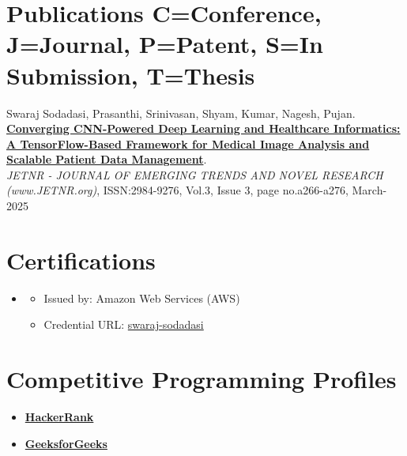 \documentclass[a4paper,11pt]{article}
\begin{document}
\section{\textbf{Publications} {\scriptsize C=Conference, J=Journal, P=Patent, S=In Submission, T=Thesis}}
\vspace{0.2mm}
\small{
\begin{enumerate}[leftmargin=*, labelsep=0.5em, align=left, widest={[\textbf{S.1}]}, itemindent=0em, label={\textbf{[\arabic*]}]}]
\item[\textbf{[J.1]}] Swaraj Sodadasi, Prasanthi, Srinivasan, Shyam, Kumar, Nagesh, Pujan. \\
\href{https://rjpn.org/jetnr/viewpaperforall.php?paper=JETNR2503029}{\textbf{Converging CNN-Powered Deep Learning and Healthcare Informatics: A TensorFlow-Based Framework for Medical Image Analysis and Scalable Patient Data Management}}. \\
\textit{JETNR - JOURNAL OF EMERGING TRENDS AND NOVEL RESEARCH (www.JETNR.org)}, ISSN:2984-9276, Vol.3, Issue 3, page no.a266-a276, March-2025
\end{enumerate}
}


\section*{\textbf{Certifications}}

\begin{itemize}[leftmargin=*]

    \item \textbf{}
    \begin{itemize}
        \item Issued by: Amazon Web Services (AWS)
        \item Credential URL: \href{https://www.credly.com/users/sodadasi-swaraj}{swaraj-sodadasi}
    \end{itemize}

\end{itemize}


\section*{\textbf{Competitive Programming Profiles}}
\begin{itemize}
    \item \href{https://www.hackerrank.com/profile/swarajacc12004} {\textbf{HackerRank}}
    \item \href{https://auth.geeksforgeeks.org/user/geeksforgeeksacc1} {\textbf{GeeksforGeeks}}
\end{itemize}
\end{document}
